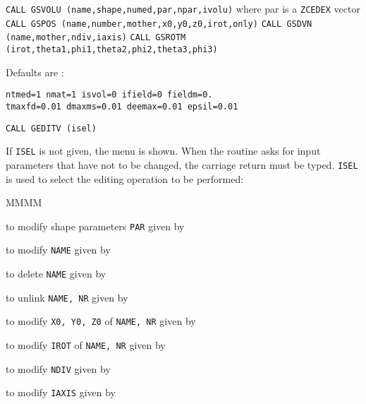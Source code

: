      
             
               
{\tt CALL GSVOLU (name,shape,numed,par,npar,ivolu)}
 where par is a {\tt ZCEDEX} vector
{\tt  CALL GSPOS (name,number,mother,x0,y0,z0,irot,only)}
{\tt  CALL GSDVN (name,mother,ndiv,iaxis)}
{\tt CALL GSROTM (irot,theta1,phi1,theta2,phi2,theta3,phi3)}
 
 
Defaults are :
\begin{center}
\tt ntmed=1  nmat=1  isvol=0  ifield=0  fieldm=0.\\
tmaxfd=0.01  dmaxms=0.01  deemax=0.01  epsil=0.01
\end{center}
{\tt CALL GEDITV (isel)}
 
If {\tt ISEL} is not given, the menu is shown.
When the routine asks for input parameters that have not to
be changed, the carriage return must be typed.
{\tt ISEL} is used to select the editing operation to be performed:
\begin{DL}{MMMM}
\item[ISEL=1] to modify shape parameters {\tt PAR} given by 
\item[ISEL=2] to modify {\tt NAME} given by 
\item[ISEL=3] to delete {\tt NAME} given by 
\item[ISEL=4] to unlink {\tt NAME, NR} given by 
\item[ISEL=5] to modify {\tt X0, Y0, Z0} of {\tt NAME, NR} given by 
\item[ISEL=6] to modify {\tt IROT} of {\tt NAME, NR} given by 
\item[ISEL=7] to modify {\tt NDIV} given by 
\item[ISEL=8] to modify {\tt IAXIS} given by 
\end{DL}
 

